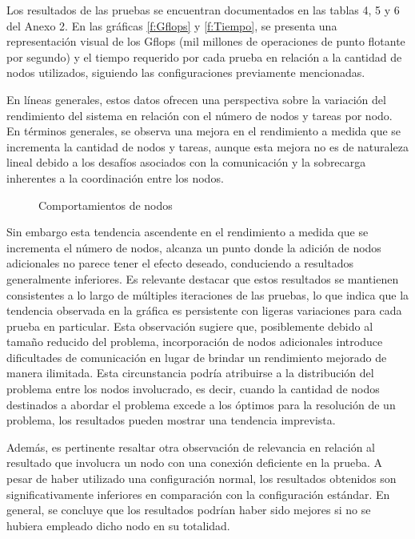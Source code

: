 \begin{spacing}{1.5}
  Los resultados de las pruebas se encuentran documentados en las tablas 4, 5 y 6 del Anexo 2. En las gráficas \ref{f:Gflops} y \ref{f:Tiempo}, se presenta una representación visual de los Gflops (mil millones de operaciones de punto flotante por segundo) y el tiempo requerido por cada prueba en relación a la cantidad de nodos utilizados, siguiendo las configuraciones previamente mencionadas.

  En líneas generales, estos datos ofrecen una perspectiva sobre la variación del rendimiento del sistema en relación con el número de nodos y tareas por nodo. En términos generales, se observa una mejora en el rendimiento a medida que se incrementa la cantidad de nodos y tareas, aunque esta mejora no es de naturaleza lineal debido a los desafíos asociados con la comunicación y la sobrecarga inherentes a la coordinación entre los nodos.

  \begin{figure}
    \centering
    \caption{Comportamientos de nodos}
    \label{f:nodos}
  \end{figure}

  Sin embargo esta tendencia ascendente en el rendimiento a medida que se incrementa el número de nodos, alcanza un punto donde la adición de nodos adicionales no parece tener el efecto deseado, conduciendo a resultados generalmente inferiores. Es relevante destacar que estos resultados se mantienen consistentes a lo largo de múltiples iteraciones de las pruebas, lo que indica que la tendencia observada en la gráfica es persistente con ligeras variaciones para cada prueba en particular. Esta observación sugiere que, posiblemente debido al tamaño reducido del problema, incorporación de nodos adicionales introduce dificultades de comunicación en lugar de brindar un rendimiento mejorado de manera ilimitada. Esta circunstancia podría atribuirse a la distribución del problema entre los nodos involucrado, es decir, cuando la cantidad de nodos destinados a abordar el problema excede a los óptimos para la resolución de un problema, los resultados pueden mostrar una tendencia imprevista.

  Además, es pertinente resaltar otra observación de relevancia en relación al resultado que involucra un nodo con una conexión deficiente en la prueba. A pesar de haber utilizado una configuración normal, los resultados obtenidos son significativamente inferiores en comparación con la configuración estándar. En general, se concluye que los resultados podrían haber sido mejores si no se hubiera empleado dicho nodo en su totalidad.


\end{spacing}
